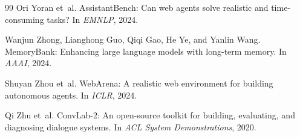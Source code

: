 \documentclass[11pt]{article}
\begin{document}
\begin{thebibliography}{99}
Ori Yoran et~al.
\newblock AssistantBench: Can web agents solve realistic and time-consuming tasks?
\newblock In \emph{EMNLP}, 2024.

Wanjun Zhong, Lianghong Guo, Qiqi Gao, He Ye, and Yanlin Wang.
\newblock MemoryBank: Enhancing large language models with long-term memory.
\newblock In \emph{AAAI}, 2024.

Shuyan Zhou et~al.
\newblock WebArena: A realistic web environment for building autonomous agents.
\newblock In \emph{ICLR}, 2024.

Qi Zhu et~al.
\newblock ConvLab-2: An open-source toolkit for building, evaluating, and diagnosing dialogue systems.
\newblock In \emph{ACL System Demonstrations}, 2020.

\end{thebibliography}
\end{document}
